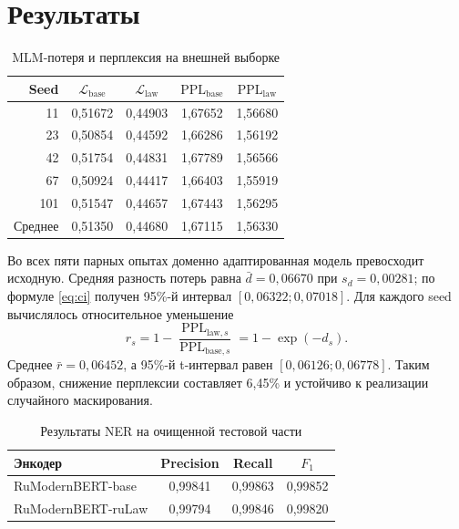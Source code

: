 \documentclass[12pt,a4paper]{article}
\newcommand{\model}{RuModernBERT-ruLaw}
\newcommand{\base}{RuModernBERT-base}
\begin{document}
\section{Результаты}
\begin{table}[ht]
\centering
\caption{MLM-потеря и перплексия на внешней выборке}
\label{tab:mlm}
\begin{tabular}{@{}rcccc@{}}
\toprule
Seed & $\mathcal L_{\mathrm{base}}$ & $\mathcal L_{\mathrm{law}}$ & $\mathrm{PPL}_{\mathrm{base}}$ & $\mathrm{PPL}_{\mathrm{law}}$\\
\midrule
11  & 0{,}51672 & 0{,}44903 & 1{,}67652 & 1{,}56680\\
23  & 0{,}50854 & 0{,}44592 & 1{,}66286 & 1{,}56192\\
42  & 0{,}51754 & 0{,}44831 & 1{,}67789 & 1{,}56566\\
67  & 0{,}50924 & 0{,}44417 & 1{,}66403 & 1{,}55919\\
101 & 0{,}51547 & 0{,}44657 & 1{,}67443 & 1{,}56295\\
\midrule
Среднее & 0{,}51350 & 0{,}44680 & 1{,}67115 & 1{,}56330\\
\bottomrule
\end{tabular}
\end{table}

Во всех пяти парных опытах доменно адаптированная модель превосходит исходную. Средняя разность потерь равна $\bar d=0{,}06670$ при $s_d=0{,}00281$; по формуле \eqref{eq:ci} получен 95\%-й интервал $[0{,}06322;0{,}07018]$. Для каждого seed вычислялось относительное уменьшение
\begin{equation}
 r_s=1-\frac{\operatorname{PPL}_{\mathrm{law},s}}{\operatorname{PPL}_{\mathrm{base},s}}=1-\exp(-d_s).
\end{equation}
Среднее $\bar r=0{,}06452$, а 95\%-й t-интервал равен $[0{,}06126;0{,}06778]$. Таким образом, снижение перплексии составляет 6{,}45\% и устойчиво к реализации случайного маскирования.

\begin{table}[ht]
\centering
\caption{Результаты NER на очищенной тестовой части}
\label{tab:ner}
\begin{tabular}{@{}lccc@{}}
\toprule
Энкодер & Precision & Recall & $F_1$\\
\midrule
\base{} & 0{,}99841 & 0{,}99863 & 0{,}99852\\
\model{} & 0{,}99794 & 0{,}99846 & 0{,}99820\\
\bottomrule
\end{tabular}
\end{table}
\end{document}
